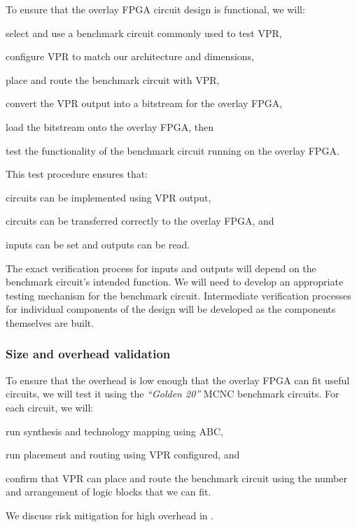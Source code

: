 To ensure that the overlay FPGA circuit design is functional, we will:
\begin{enumeration}
	\item select and use a benchmark circuit commonly used to test VPR,
	\item configure VPR to match our architecture and dimensions,
	\item place and route the benchmark circuit with VPR,
	\item convert the VPR output into a bitstream for the overlay FPGA,
	\item load the bitstream onto the overlay FPGA, then 
	\item test the functionality of the benchmark circuit running on the overlay FPGA.
\end{enumeration}
This test procedure ensures that:
\begin{itemlist}
	\item circuits can be implemented using VPR output,
	\item circuits can be transferred correctly to the overlay FPGA, and
	\item inputs can be set and outputs can be read.
\end{itemlist}
The exact verification process for inputs and outputs will depend on the benchmark circuit's intended function.
We will need to develop an appropriate testing mechanism for the benchmark circuit.
Intermediate verification processes for individual components of the design will be developed as the components themselves are built.


\subsubsection{Size and overhead validation}

To ensure that the overhead is low enough that the overlay FPGA can fit useful circuits, we will test it using the \emph{``Golden 20''} MCNC benchmark circuits.
For each circuit, we will:
\begin{enumeration}
	\item run synthesis and technology mapping using ABC,
	\item run placement and routing using VPR configured, and
	\item confirm that VPR can place and route the benchmark circuit using the number and arrangement of logic blocks that we can fit.
\end{enumeration}
We discuss risk mitigation for high overhead in .


